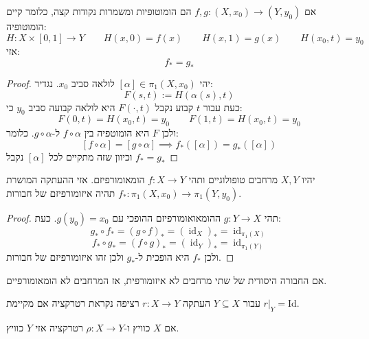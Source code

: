 \documentclass{tstextbook}
\begin{document}
\begin{proposition}
אם \(f,g:(X,x_{0})\to (Y,y_{0})\) הם הומוטופיות ומשמרות נקודות קצה, כלומר קיים הומוטופיה:
$$H:X\times[0,1]\to Y\qquad H(x,0)=f(x)\qquad H(x,1)=g(x)\qquad H(x_{0},t)=y_{0}$$
אזי:
$$f_{*}=g_{*}$$

\end{proposition}
\begin{proof}
יהי \(\left[ \alpha \right]\in\pi_{1}(X,x_{0})\) לולאה סביב \(x_{0}\). נגדיר:
$$F(s,t):=H\left( \alpha(s),t \right)$$
כעת עבור \(t\) קבוע נקבל \(F\left( \cdot,t \right)\) היא לולאה קבועה סביב \(y_{0}\) כי:
$$F(0,t)=H(x_{0},t)=y_{0}\qquad F(1,t)=H(x_{0},t)=y_{0}$$
ולכן \(F\) היא הומוטפיה בין \(f\circ\alpha\) ל-\(g \circ \alpha\). כלומר:
$$\left[ f\circ \alpha \right]=\left[ g \circ  \alpha \right]\implies f_{*}\left( \left[ \alpha \right] \right)=g_{*}\left( \left[ \alpha \right] \right)$$
וכיוון שזה מתקיים לכל \(\left[ \alpha \right]\) נקבל \(f_{*}=g_{*}\)

\end{proof}
\begin{example}
\end{example}
\begin{proposition}
יהיו \(X,Y\) מרחבים טופולוגיים ותהי \(f:X\to Y\) הומאומורפיזם. אזי ההעתקה המושרת \(f_{*}:\pi_{1}(X,x_{0})\to\pi_{1}(Y,y_{0})\) תהיה איזומורפיזם של חבורות.

\end{proposition}
\begin{proof}
תהי \(g:Y\to X\) ההומאואומורפיזם ההופכי עם \(g(y_{0})=x_{0}\). כעת:
$$g_{*}\circ f_{*}=(g\circ f)_{*}=(\operatorname{id}_{X})_{*}=\operatorname{id}_{\pi_{1}(X)}$$$$f_{*}\circ g_{*}=(f\circ g)_{*}=(\operatorname{id}_{Y})_{*}=\operatorname{id}_{\pi_{1}(Y)}$$
ולכן \(f_{*}\) היא הופכית ל-\(g_{*}\) ולכן זהו איזומורפיזם של חבורות.

\end{proof}
\begin{corollary}
אם החבורה היסודית של שתי מרחבים לא איזומורפית, אז המרחבים לא הומאומורפיים.

\end{corollary}
\begin{definition}[רטרקציה]
עבור \(Y\subseteq X\) העתקה \(r:X\to Y\) רציפה נקראת רטרקציה אם מקיימת \(r|_{Y}=\mathrm{Id}\). 

\end{definition}
\begin{proposition}
אם \(X\) כוויץ ו-\(\rho:X\to Y\) רטרקציה אזי \(Y\) כוויץ.

\end{proposition}
\end{document}
